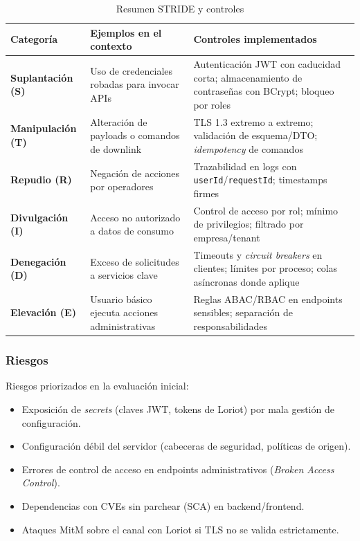 \documentclass[12pt,a4paper,oneside]{report}
\begin{document}
\begin{table}[H]
\caption{Resumen STRIDE y controles}
\label{tab:stride}
\centering
\begin{tabularx}{\textwidth}{>{\bfseries}l X X}
\toprule
Categoría & Ejemplos en el contexto & Controles implementados \\
\midrule
Suplantación (S) & Uso de credenciales robadas para invocar APIs & Autenticación JWT con caducidad corta; almacenamiento de contraseñas con BCrypt; bloqueo por roles \\
Manipulación (T) & Alteración de payloads o comandos de downlink & TLS 1.3 extremo a extremo; validación de esquema/DTO; \textit{idempotency} de comandos \\
Repudio (R) & Negación de acciones por operadores & Trazabilidad en logs con \texttt{userId}/\texttt{requestId}; timestamps firmes \\
Divulgación (I) & Acceso no autorizado a datos de consumo & Control de acceso por rol; mínimo de privilegios; filtrado por empresa/tenant \\
Denegación (D) & Exceso de solicitudes a servicios clave & Timeouts y \textit{circuit breakers} en clientes; límites por proceso; colas asíncronas donde aplique \\
Elevación (E) & Usuario básico ejecuta acciones administrativas & Reglas ABAC/RBAC en endpoints sensibles; separación de responsabilidades \\
\bottomrule
\end{tabularx}
\end{table}

\subsubsection{Riesgos}

Riesgos priorizados en la evaluación inicial:
\begin{itemize}
  \item Exposición de \textit{secrets} (claves JWT, tokens de Loriot) por mala gestión de configuración.
  \item Configuración débil del servidor (cabeceras de seguridad, políticas de origen).
  \item Errores de control de acceso en endpoints administrativos (\textit{Broken Access Control}).
  \item Dependencias con CVEs sin parchear (SCA) en backend/frontend.
  \item Ataques MitM sobre el canal con Loriot si TLS no se valida estrictamente.
\end{itemize}
\end{document}
